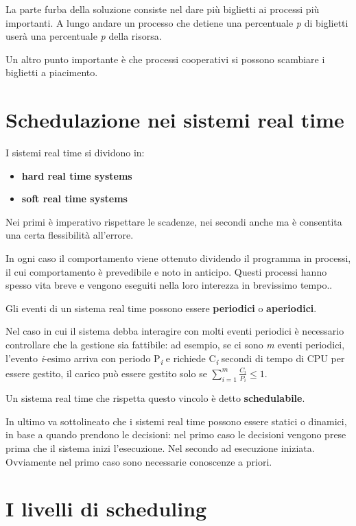 La parte furba della soluzione consiste nel dare più biglietti ai processi più importanti. A lungo andare un processo che detiene una percentuale \textit{p} di biglietti userà una percentuale \textit{p} della risorsa.

Un altro punto importante è che processi cooperativi si possono scambiare i biglietti a piacimento.

\section{Schedulazione nei sistemi real time}

I sistemi real time si dividono in:
\begin{itemize}
    \item \textbf{hard real time systems}
    \item \textbf{soft real time systems}
\end{itemize}

Nei primi è imperativo rispettare le scadenze, nei secondi anche ma è consentita una certa flessibilità all'errore.

In ogni caso il comportamento viene ottenuto dividendo il programma in processi, il cui comportamento è prevedibile e noto in anticipo. Questi processi hanno spesso vita breve e vengono eseguiti nella loro interezza in brevissimo tempo..

Gli eventi di un sistema real time possono essere \textbf{periodici} o \textbf{aperiodici}. 

Nel caso in cui il sistema debba interagire con molti eventi periodici è necessario controllare che la gestione sia fattibile:
ad esempio, se ci sono \textit{m} eventi periodici, l'evento \textit{i}-esimo arriva con periodo P\textsubscript{\textit{i}} e richiede C\textsubscript{\textit{i}} secondi di tempo di CPU per essere gestito, il carico può essere gestito solo se $\sum_{i=1}^{m}{\frac{C_i}{P_i}} \leq 1$.

Un sistema real time che rispetta questo vincolo è detto \textbf{schedulabile}.

In ultimo va sottolineato che i sistemi real time possono essere statici o dinamici, in base a quando prendono le decisioni: nel primo caso le decisioni vengono prese prima che il sistema inizi l'esecuzione. Nel secondo ad esecuzione iniziata. Ovviamente nel primo caso sono necessarie conoscenze a priori.


\section{I livelli di scheduling}

